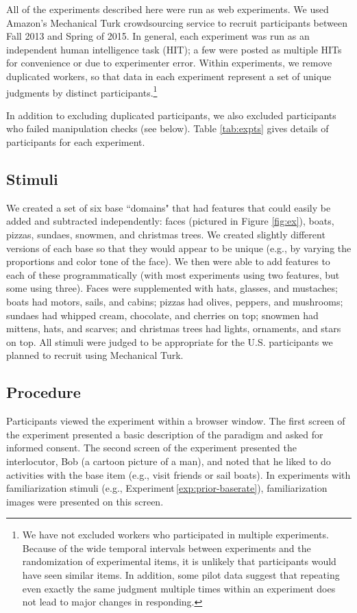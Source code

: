 \documentclass[man,noapacite]{apa2}
\newcounter{Experiment}
\newcommand{\exptref}[1]{Experiment\,\ref{#1}}
\begin{document}
All of the experiments described here were run as web experiments. We used Amazon's Mechanical Turk crowdsourcing service to recruit participants between Fall 2013 and Spring of 2015. In general, each experiment was run as an independent human intelligence task (HIT); a few were posted as multiple HITs for convenience or due to experimenter error. Within experiments, we remove duplicated workers, so that data in each experiment represent a set of unique judgments by distinct participants.\footnote{We have not excluded workers who participated in multiple experiments. Because of the wide temporal intervals between experiments and the randomization of experimental items, it is unlikely that participants would have seen similar items. In addition, some pilot data suggest that repeating even exactly the same judgment multiple times within an experiment does not lead to major changes in responding.}

In addition to excluding duplicated participants, we also excluded participants who failed manipulation checks (see below). Table \ref{tab:expts} gives details of participants for each experiment.

\subsection{Stimuli}

We created a set of six base ``domains" that had features that could easily be added and subtracted independently: faces (pictured in Figure \ref{fig:ex}), boats, pizzas, sundaes, snowmen, and christmas trees. We created slightly different versions of each base so that they would appear to be unique (e.g., by varying the proportions and color tone of the face). We then were able to add features to each of these programmatically (with most experiments using two features, but some using three). Faces were supplemented with hats, glasses, and mustaches; boats had motors, sails, and cabins; pizzas had olives, peppers, and mushrooms; sundaes had whipped cream, chocolate, and cherries on top; snowmen had mittens, hats, and scarves; and christmas trees had lights, ornaments, and stars on top. All stimuli were judged to be appropriate for the U.S. participants we planned to recruit using Mechanical Turk.

\subsection{Procedure}

Participants viewed the experiment within a browser window. The first screen of the experiment presented a basic description of the paradigm and asked for informed consent. The second screen of the experiment presented the interlocutor, Bob (a cartoon picture of a man), and noted that he liked to do activities with the base item (e.g., visit friends or sail boats). In experiments with familiarization stimuli (e.g., \exptref{exp:prior-baserate}),  familiarization images were presented on this screen.
\end{document}
